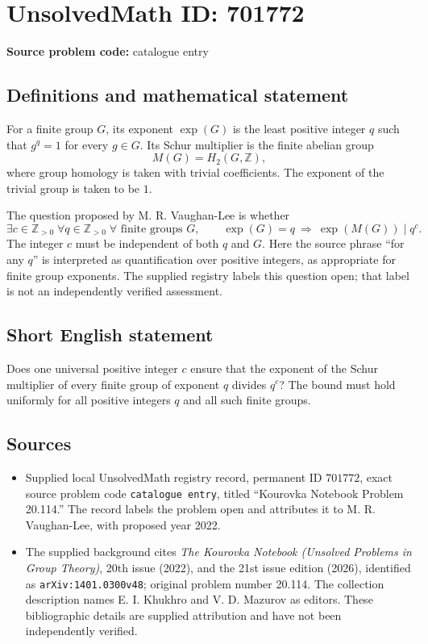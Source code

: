 \documentclass[11pt]{article}
\newcommand{\Z}{\mathbb{Z}}
\begin{document}
\section*{UnsolvedMath ID: 701772}
\textbf{Source problem code:} catalogue entry
\subsection{Definitions and mathematical statement}
For a finite group \(G\), its exponent \(\exp(G)\) is the least positive integer \(q\) such that \(g^q=1\) for every \(g\in G\). Its Schur multiplier is the finite abelian group
\[
M(G)=H_2(G,\Z),
\]
where group homology is taken with trivial coefficients. The exponent of the trivial group is taken to be \(1\).

The question proposed by M. R. Vaughan-Lee is whether
\[
\exists c\in\Z_{>0}\;\forall q\in\Z_{>0}\;\forall\text{ finite groups }G,
\qquad
\exp(G)=q\ \Longrightarrow\ \exp(M(G))\mid q^c.
\]
The integer \(c\) must be independent of both \(q\) and \(G\). Here the source phrase ``for any \(q\)'' is interpreted as quantification over positive integers, as appropriate for finite group exponents. The supplied registry labels this question open; that label is not an independently verified assessment.
\subsection{Short English statement}
Does one universal positive integer \(c\) ensure that the exponent of the Schur multiplier of every finite group of exponent \(q\) divides \(q^c\)? The bound must hold uniformly for all positive integers \(q\) and all such finite groups.
\subsection{Sources}
\begin{itemize}
\item Supplied local UnsolvedMath registry record, permanent ID \(701772\), exact source problem code \texttt{catalogue entry}, titled ``Kourovka Notebook Problem 20.114.'' The record labels the problem open and attributes it to M. R. Vaughan-Lee, with proposed year 2022.
\item The supplied background cites \emph{The Kourovka Notebook (Unsolved Problems in Group Theory)}, 20th issue (2022), and the 21st issue edition (2026), identified as \texttt{arXiv:1401.0300v48}; original problem number 20.114. The collection description names E. I. Khukhro and V. D. Mazurov as editors. These bibliographic details are supplied attribution and have not been independently verified.
\end{itemize}
\end{document}
